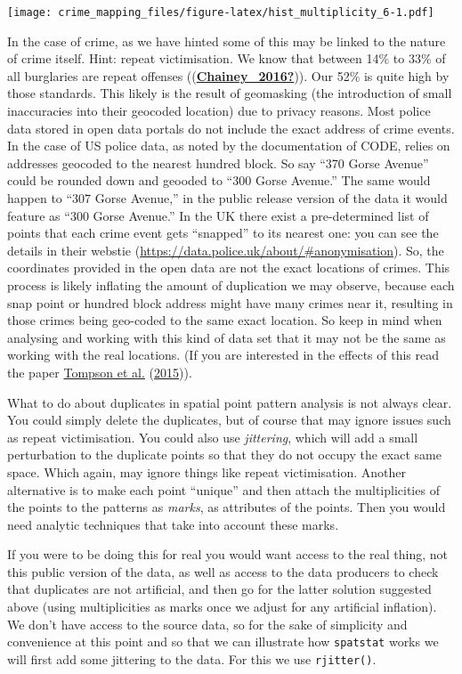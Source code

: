 \documentclass[
  krantz2]{krantz}
\begin{document}
\texttt{[image: crime\_mapping\_files/figure-latex/hist\_multiplicity\_6-1.pdf]}

In the case of crime, as we have hinted some of this may be linked to the nature of crime itself. Hint: repeat victimisation. We know that between 14\% to 33\% of all burglaries are repeat offenses ((\protect\hyperlink{ref-Chainey_2016}{\textbf{Chainey\_2016?}})). Our 52\% is quite high by those standards. This likely is the result of geomasking (the introduction of small inaccuracies into their geocoded location) due to privacy reasons. Most police data stored in open data portals do not include the exact address of crime events. In the case of US police data, as noted by the documentation of CODE, relies on addresses geocoded to the nearest hundred block. So say ``370 Gorse Avenue'' could be rounded down and geooded to ``300 Gorse Avenue.'' The same would happen to ``307 Gorse Avenue,'' in the public release version of the data it would feature as ``300 Gorse Avenue.'' In the UK there exist a pre-determined list of points that each crime event gets ``snapped'' to its nearest one: you can see the details in their webstie (\url{https://data.police.uk/about/\#anonymisation}). So, the coordinates provided in the open data are not the exact locations of crimes. This process is likely inflating the amount of duplication we may observe, because each snap point or hundred block address might have many crimes near it, resulting in those crimes being geo-coded to the same exact location. So keep in mind when analysing and working with this kind of data set that it may not be the same as working with the real locations. (If you are interested in the effects of this read the paper \protect\hyperlink{ref-Tompson_2015}{Tompson et al.} (\protect\hyperlink{ref-Tompson_2015}{2015})).

What to do about duplicates in spatial point pattern analysis is not always clear. You could simply delete the duplicates, but of course that may ignore issues such as repeat victimisation. You could also use \emph{jittering}, which will add a small perturbation to the duplicate points so that they do not occupy the exact same space. Which again, may ignore things like repeat victimisation. Another alternative is to make each point ``unique'' and then attach the multiplicities of the points to the patterns as \emph{marks}, as attributes of the points. Then you would need analytic techniques that take into account these marks.

If you were to be doing this for real you would want access to the real thing, not this public version of the data, as well as access to the data producers to check that duplicates are not artificial, and then go for the latter solution suggested above (using multiplicities as marks once we adjust for any artificial inflation). We don't have access to the source data, so for the sake of simplicity and convenience at this point and so that we can illustrate how \texttt{spatstat} works we will first add some jittering to the data. For this we use \texttt{rjitter()}.
\end{document}
